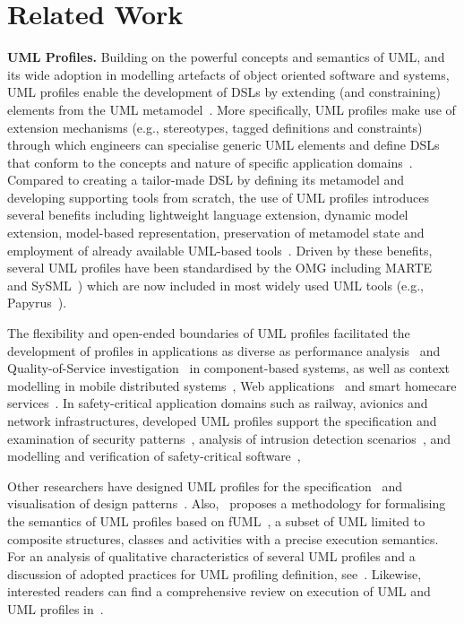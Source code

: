 \section{Related Work} 
\label{sec:related}

\textbf{UML Profiles.}
Building on the powerful concepts and semantics of UML, and its wide adoption in modelling artefacts of object oriented software and systems, UML profiles enable the development of DSLs by extending (and constraining) elements from the UML metamodel~\cite{FuentesFernandez2004:UMLME}. 
More specifically, UML profiles make use of extension mechanisms (e.g., stereotypes, tagged definitions and constraints) through which engineers can 
specialise generic UML elements and define DSLs that conform to the concepts and nature of specific application domains~\cite{Selic2007:ISORC}. 
Compared to creating a tailor-made DSL by defining its metamodel and developing supporting tools from scratch, the use of UML profiles introduces several benefits including lightweight language extension, dynamic model extension, model-based representation, preservation of metamodel state and employment of already available UML-based tools~\cite{langer2011uml}. 
Driven by these benefits, several UML profiles have been standardised by the OMG including MARTE~\cite{omg2011marte} and SySML~\cite{friedenthal2014practical}) which are now included in most widely used UML tools (e.g., Papyrus~\cite{lanusse2009papyrus}). 

The flexibility and open-ended boundaries of UML profiles facilitated the development of profiles in applications as diverse as performance analysis~\cite{xu2003performance} and Quality-of-Service investigation~\cite{cortellessa2004towards} in component-based systems, as well as context modelling in mobile distributed systems~\cite{Simons2007:JVLC},  Web applications~\cite{Moreno2007:IETS} and smart homecare services~\cite{Walderhaug2009:MODELS}. In safety-critical application domains
such as railway, avionics and network infrastructures, developed UML profiles support the specification and examination of security patterns~\cite{Bouaziz2012:ICCSE,Rodriguez2010:SERENE}, analysis of intrusion detection scenarios~\cite{hussein2006umlintr}, and modelling and verification of safety-critical software~\cite{Bernardi2013:JRESS,zoughbi2007uml}, 

Other researchers have designed UML profiles for the 
specification~\cite{Debnath2006:ICCSA,Mak2004:ICSE} and visualisation of 
design patterns~\cite{Dong2007:TSE}. 
Also,~\cite{tatibouet2014formalizing} proposes a methodology for formalising the semantics of UML profiles based on fUML~\cite{fuml}, a subset of UML
limited to composite structures, classes and activities with a precise execution semantics. 
For an analysis of qualitative characteristics of several UML profiles and a discussion of adopted practices for UML profiling definition, see~\cite{Pardillo2010:MODELS}.
Likewise, interested readers can find a comprehensive review on execution of UML and UML profiles in~\cite{ciccozzi2018execution}.

